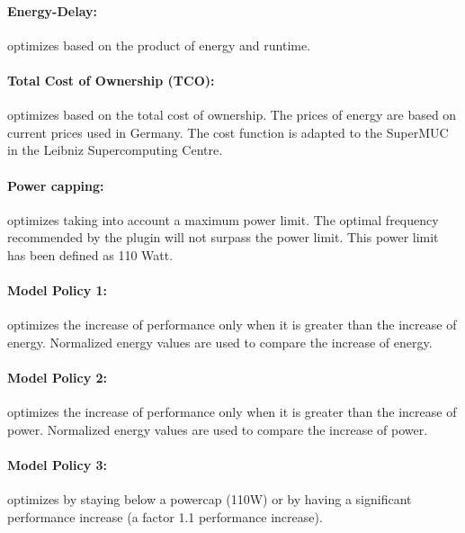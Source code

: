 \documentclass[11pt,a4paper, oneside]{book} %
\begin{document}
  \paragraph{Energy-Delay:} optimizes based on the product of energy and runtime.
  \paragraph{Total Cost of Ownership (TCO):}  optimizes based on the total cost of ownership. The prices of energy are based on current prices used in Germany. The cost function is adapted to the SuperMUC in the Leibniz Supercomputing Centre.
  \paragraph{Power capping:} optimizes taking into account a maximum power limit. The optimal frequency recommended by the plugin will not surpass the power limit. This power limit has been defined as 110 Watt.
  \paragraph{Model Policy 1:} optimizes the increase of performance only when it is greater than the increase of energy. Normalized energy values are used to compare the increase of energy.
  \paragraph{Model Policy 2:} optimizes the increase of performance only when it is greater than the increase of power. Normalized energy values are used to compare the increase of power.
  \paragraph{Model Policy 3:} optimizes by staying below a powercap (110W) or by having a significant performance increase (a factor 1.1 performance increase).
\end{document}
